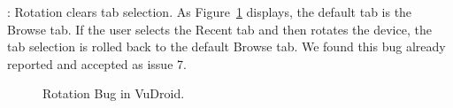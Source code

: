 : Rotation clears tab selection. As Figure~\ref{fig:bug9} displays, the default tab is the Browse tab. If the user selects the Recent tab and then rotates the device, the tab selection is rolled back to the default Browse tab. We found this bug already reported and accepted as issue 7.
\begin{figure}[!t]
\centering
\begin{minipage}{.8\columnwidth}
\hfill
{}
\hfill
{}
\caption{Rotation Bug in VuDroid.}
\label{fig:bug9}
\end{minipage}
\end{figure}

